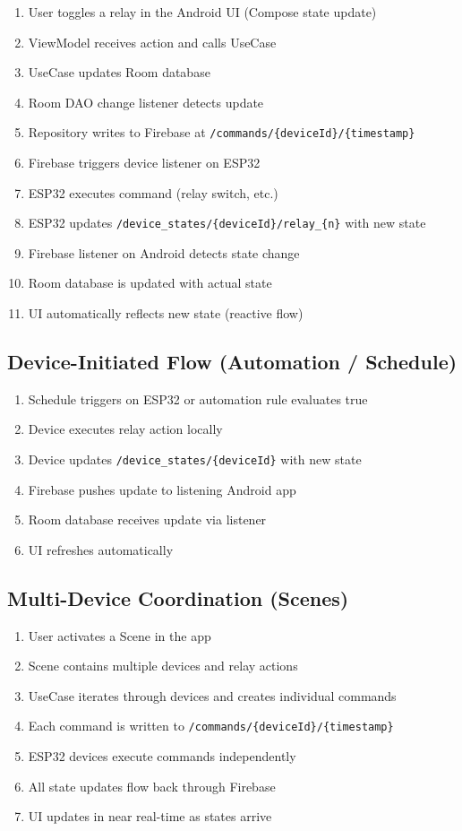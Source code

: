 \begin{enumerate}
    \item User toggles a relay in the Android UI (Compose state update)
    \item ViewModel receives action and calls UseCase
    \item UseCase updates Room database
    \item Room DAO change listener detects update
    \item Repository writes to Firebase at \texttt{/commands/\{deviceId\}/\{timestamp\}}
    \item Firebase triggers device listener on ESP32
    \item ESP32 executes command (relay switch, etc.)
    \item ESP32 updates \texttt{/device\_states/\{deviceId\}/relay\_\{n\}} with new state
    \item Firebase listener on Android detects state change
    \item Room database is updated with actual state
    \item UI automatically reflects new state (reactive flow)
\end{enumerate}

\subsection{Device-Initiated Flow (Automation / Schedule)}

\begin{enumerate}
    \item Schedule triggers on ESP32 or automation rule evaluates true
    \item Device executes relay action locally
    \item Device updates \texttt{/device\_states/\{deviceId\}} with new state
    \item Firebase pushes update to listening Android app
    \item Room database receives update via listener
    \item UI refreshes automatically
\end{enumerate}

\subsection{Multi-Device Coordination (Scenes)}

\begin{enumerate}
    \item User activates a Scene in the app
    \item Scene contains multiple devices and relay actions
    \item UseCase iterates through devices and creates individual commands
    \item Each command is written to \texttt{/commands/\{deviceId\}/\{timestamp\}}
    \item ESP32 devices execute commands independently
    \item All state updates flow back through Firebase
    \item UI updates in near real-time as states arrive
\end{enumerate}


